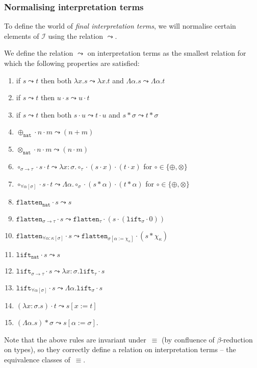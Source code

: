 \documentclass[runningheads,a4paper]{llncs}
\newcommand{\Iterms}{\mathcal{I}}
\newcommand{\quant}[2]{\forall #1[#2]}
\newcommand{\arrtype}{\rightarrow}
\newcommand{\abs}[2]{\lambda #1.#2}
\newcommand{\tabs}[2]{\Lambda #1.#2}
\newcommand{\app}[2]{#1 \cdot #2}
\newcommand{\tapp}[2]{#1 * #2}
\newcommand{\subst}[2]{#1:=#2}
\newcommand{\nat}{\mathtt{nat}}
\newcommand{\flatten}{\mathtt{flatten}}
\newcommand{\lift}{\mathtt{lift}}
\begin{document}
\subsubsection{Normalising interpretation terms}
To define the world of \emph{final interpretation terms}, we will
normalise certain elements of $\Iterms$ using the relation $\leadsto$.

\begin{definition}
  We define the relation $\leadsto$ on interpretation terms as the
  smallest relation for which the following properties are satisfied:
  \begin{enumerate}
  \item\label{leadsto:mono:abs}
    if $s \leadsto t$ then both $\abs{x}{s} \leadsto \abs{x}{t}$ and
    $\tabs{\alpha}{s} \leadsto \tabs{\alpha}{t}$
  \item\label{leadsto:mono:right}
    if $s \leadsto t$ then $\app{u}{s} \leadsto \app{u}{t}$
  \item\label{leadsto:mono:left}
    if $s \leadsto t$ then both $\app{s}{u} \leadsto \app{t}{u}$ and
    $\tapp{s}{\sigma} \leadsto \tapp{t}{\sigma}$
  \item\label{leadsto:plus:base}
    $\app{\app{\oplus_{\nat}}{n}}{m} \leadsto (n+m)$
  \item\label{leadsto:times:base} $\app{\app{\otimes_{\nat}}{n}}{m}
    \leadsto (n \cdot m)$
  \item\label{leadsto:circ:arrow} $\app{\app{\circ_{\sigma \arrtype
        \tau}}{s}}{t} \leadsto
    \abs{x:\sigma}{\app{\app{\circ_\tau}{(\app{s}{x})}}{(\app{t}{x})}}$
    for $\circ \in \{ \oplus, \otimes \}$
  \item\label{leadsto:circ:forall}
    $\app{\app{\circ_{\quant{\alpha}{\sigma}}}{s}}{t} \leadsto
    \tabs{\alpha}{\app{\app{\circ_\sigma}{(\tapp{s}{\alpha})}}{(
        \tapp{t}{\alpha})}}$ for $\circ \in \{ \oplus, \otimes \}$
  \item $\app{\flatten_\nat}{s} \leadsto s$
  \item $\app{\flatten_{\sigma \arrtype \tau}}{s} \leadsto
    \app{\flatten_\tau}{(\app{s}{(\app{\lift_\sigma}{0})})}$
  \item $\app{\flatten_{\quant{\alpha:\kappa}{\sigma}}}{s} \leadsto
    \app{\flatten_{\sigma[\subst{\alpha}{\chi_\kappa}]}}{(\tapp{s}{\chi_\kappa})}$
  \item $\app{\lift_\nat}{s} \leadsto s$
  \item $\app{\lift_{\sigma \arrtype \tau}}{s} \leadsto
    \abs{x:\sigma}{\app{\lift_{\tau}}{s}}$
  \item $\app{\lift_{\quant{\alpha}{\sigma}}}{s} \leadsto
    \tabs{\alpha}{\app{\lift_{\sigma}}{s}}$
  \item\label{leadsto:beta:abs} $\app{(\abs{x:\sigma}{s})}{t} \leadsto
    s[\subst{x}{t}]$
  \item\label{leadsto:beta:tabs} $\tapp{(\tabs{\alpha}{s})}{\sigma}
    \leadsto s[\subst{\alpha}{\sigma}]$.
  \end{enumerate}
  Note that the above rules are invariant under~$\equiv$ (by
  confluence of $\beta$-reduction on types), so they correctly define
  a relation on interpretation terms -- the equivalence classes
  of~$\equiv$.


\end{definition}
\end{document}
